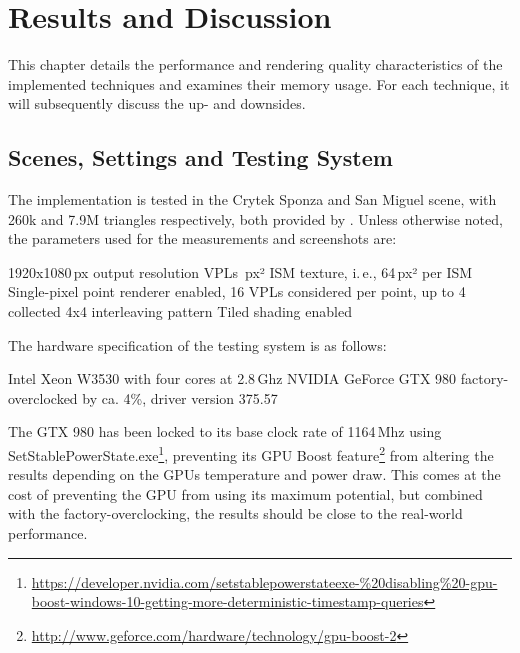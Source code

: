 

\chapter{Results and Discussion}
\label{chap:results}

This chapter details the performance and rendering quality characteristics of the implemented techniques and examines their memory usage. For each technique, it will subsequently discuss the up- and downsides.

\section{Scenes, Settings and Testing System}
\label{sec:results:settings}

The implementation is tested in the Crytek Sponza and San Miguel scene, with 260k and 7.9M triangles respectively, both provided by \citet{McGuire2011Data}. Unless otherwise noted, the parameters used for the measurements and screenshots are:

\begin{outline}
    \1 1920x1080\,px output resolution
     VPLs
    \,px² ISM texture, i.\,e., 64\,px² per ISM
    \1 Single-pixel point renderer enabled, 16 VPLs considered per point, up to 4 collected
    \1 4x4 interleaving pattern
    \1 Tiled shading enabled
\end{outline}

\noindent
The hardware specification of the testing system is as follows:

\begin{outline}
    \1 Intel Xeon W3530 with four cores at 2.8\,Ghz
    \1 NVIDIA GeForce GTX 980 factory-overclocked by ca. 4\%, driver version 375.57
\end{outline}

The GTX 980 has been locked to its base clock rate of 1164\,Mhz using SetStablePowerState.exe\footnote{\url{https://developer.nvidia.com/setstablepowerstateexe-\%20disabling\%20-gpu-boost-windows-10-getting-more-deterministic-timestamp-queries}}, preventing its GPU Boost feature\footnote{\url{http://www.geforce.com/hardware/technology/gpu-boost-2}} from altering the results depending on the GPUs temperature and power draw. This comes at the cost of preventing the GPU from using its maximum potential, but combined with the factory-overclocking, the results should be close to the real-world performance.

